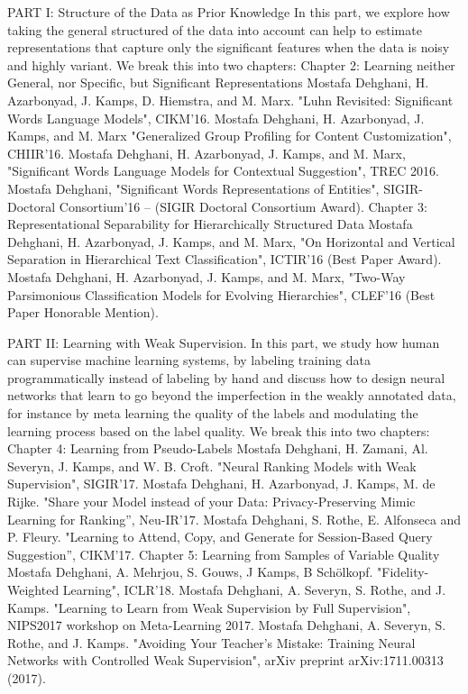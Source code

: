 PART I: Structure of the Data as Prior Knowledge
In this part, we explore how taking the general structured of the data into account can help to estimate representations that capture only the significant features when the data is noisy and highly variant. We break this into two chapters:
Chapter 2: Learning neither General, nor Specific, but Significant Representations 
Mostafa Dehghani, H. Azarbonyad, J. Kamps, D. Hiemstra, and M. Marx. "Luhn Revisited: Significant Words Language Models", CIKM'16.
Mostafa Dehghani, H. Azarbonyad, J. Kamps, and M. Marx "Generalized Group Profiling for Content Customization", CHIIR'16.
Mostafa Dehghani, H. Azarbonyad, J. Kamps, and M. Marx, "Significant Words Language Models for Contextual Suggestion", TREC  2016.
Mostafa Dehghani, "Significant Words Representations of Entities", SIGIR-Doctoral Consortium'16 -- (SIGIR Doctoral Consortium Award).
Chapter 3:  Representational Separability for Hierarchically Structured Data
Mostafa Dehghani, H. Azarbonyad, J. Kamps, and M. Marx, "On Horizontal and Vertical Separation in Hierarchical Text Classification", ICTIR'16 (Best Paper Award).
Mostafa Dehghani, H. Azarbonyad, J. Kamps, and M. Marx, "Two-Way Parsimonious Classification Models for Evolving Hierarchies", CLEF'16 (Best Paper Honorable Mention).

PART II: Learning with Weak Supervision.
In this part, we study how human can supervise machine learning systems, by labeling training data programmatically instead of labeling by hand and discuss how to design neural networks that learn to go beyond the imperfection in the weakly annotated data, for instance by meta learning the quality of the labels and modulating the learning process based on the label quality. We break this into two chapters:
Chapter 4: Learning from Pseudo-Labels
Mostafa Dehghani, H. Zamani, Al. Severyn, J. Kamps, and W. B. Croft. "Neural Ranking Models with Weak Supervision", SIGIR'17.
Mostafa Dehghani, H. Azarbonyad, J. Kamps, M. de Rijke. "Share your Model instead of your Data: Privacy-Preserving Mimic Learning for Ranking'', Neu-IR'17.
Mostafa Dehghani, S. Rothe, E. Alfonseca and P. Fleury. "Learning to Attend, Copy, and Generate for Session-Based Query Suggestion'', CIKM'17.
Chapter 5: Learning from Samples of Variable Quality
Mostafa Dehghani, A. Mehrjou, S. Gouws, J Kamps, B Schölkopf. "Fidelity-Weighted Learning", ICLR'18.
Mostafa Dehghani, A. Severyn, S. Rothe, and J. Kamps. "Learning to Learn from Weak Supervision by Full Supervision", NIPS2017 workshop on Meta-Learning 2017.
Mostafa Dehghani, A. Severyn, S. Rothe, and J. Kamps. "Avoiding Your Teacher’s Mistake: Training Neural Networks with Controlled Weak Supervision", arXiv preprint arXiv:1711.00313 (2017). 

